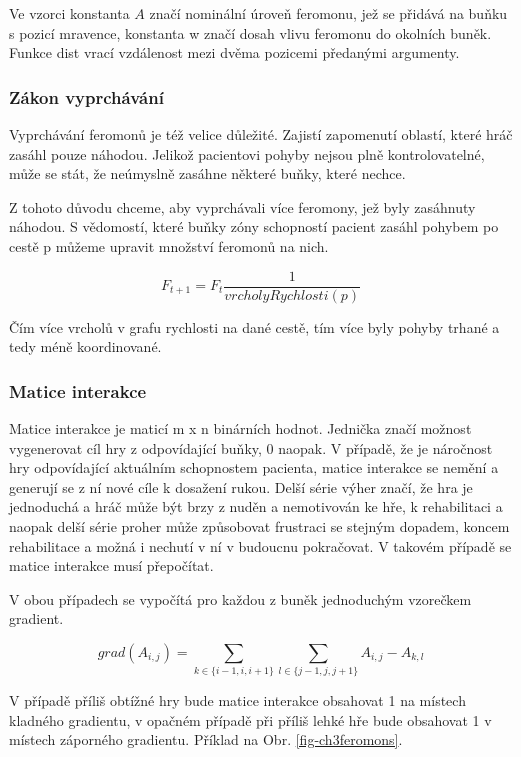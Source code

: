 Ve vzorci konstanta $A$ značí nominální úroveň feromonu, jež se přidává na buňku s pozicí mravence, konstanta w značí dosah vlivu feromonu do okolních buněk. Funkce dist vrací vzdálenost mezi dvěma pozicemi předanými argumenty.

\subsubsection{Zákon vyprchávání}

Vyprchávání feromonů je též velice důležité. Zajistí zapomenutí oblastí, které hráč zasáhl pouze náhodou. Jelikož pacientovi pohyby nejsou plně kontrolovatelné, může se stát, že neúmyslně zasáhne některé buňky, které nechce.

Z tohoto důvodu chceme, aby vyprchávali více feromony, jež byly zasáhnuty náhodou. S vědomostí, které buňky zóny schopností pacient zasáhl pohybem po cestě p můžeme upravit množství feromonů na nich.

\begin{equation}
	F_{t+1} = F_t\frac{1}{vrcholyRychlosti(p)}
\end{equation}

Čím více vrcholů v grafu rychlosti na dané cestě, tím více byly pohyby trhané a tedy méně koordinované.

\subsubsection{Matice interakce}

Matice interakce je maticí m x n binárních hodnot. Jednička značí možnost vygenerovat cíl hry z odpovídající buňky, 0 naopak. V případě, že je náročnost hry odpovídající aktuálním schopnostem pacienta, matice interakce se nemění a generují se z ní nové cíle k dosažení rukou. Delší série výher značí, že hra je jednoduchá a hráč může být brzy z nuděn a nemotivován ke hře, k rehabilitaci a naopak delší série proher může způsobovat frustraci se stejným dopadem, koncem rehabilitace a možná i nechutí v ní v budoucnu pokračovat. V takovém případě se matice interakce musí přepočítat.

V obou případech se vypočítá pro každou z buněk jednoduchým vzorečkem gradient.

\begin{equation}
	grad(A_{i,j}) = \sum_{k \in \{i-1, i, i+1\}} \sum_{l \in \{j-1, j, j+1\}} A_{i, j} - A_{k, l}
\end{equation}

V případě příliš obtížné hry bude matice interakce obsahovat 1 na místech kladného gradientu, v opačném případě při příliš lehké hře bude obsahovat 1 v místech záporného gradientu. Příklad na Obr. \ref{fig-ch3feromons}.

